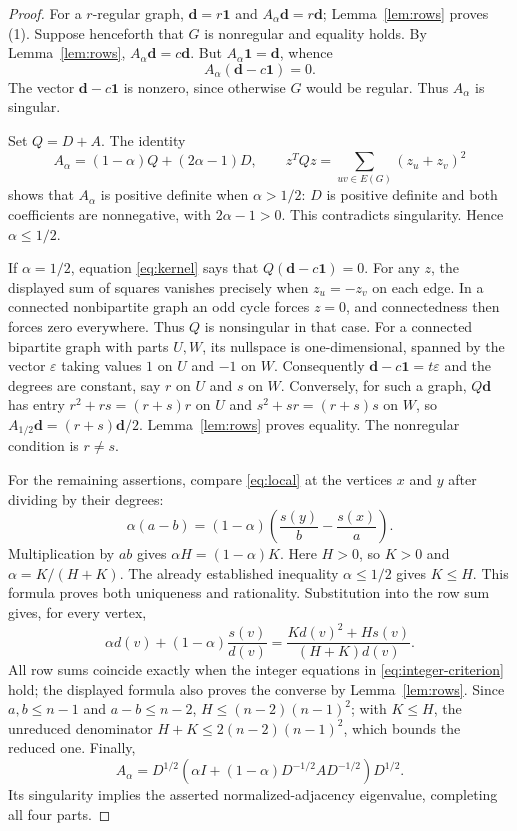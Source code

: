 \documentclass[11pt]{amsart}
\theoremstyle{remark}
\newcommand{\dd}{\boldsymbol{d}}
\newcommand{\one}{\boldsymbol{1}}
\begin{document}
\begin{proof}
For a $r$-regular graph, $\dd=r\one$ and
$A_\alpha\dd=r\dd$; Lemma~\ref{lem:rows} proves (1).
Suppose henceforth that $G$ is nonregular and equality holds.
By Lemma~\ref{lem:rows}, $A_\alpha\dd=c\dd$. But
$A_\alpha\one=\dd$, whence
\begin{equation}\label{eq:kernel}
 A_\alpha(\dd-c\one)=0.
\end{equation}
The vector $\dd-c\one$ is nonzero, since otherwise $G$ would be
regular. Thus $A_\alpha$ is singular.

Set $Q=D+A$. The identity
\[
 A_\alpha=(1-\alpha)Q+(2\alpha-1)D,
 \qquad z^TQz=\sum_{uv\in E(G)}(z_u+z_v)^2
\]
shows that $A_\alpha$ is positive definite when $\alpha>1/2$:
$D$ is positive definite and both coefficients are nonnegative,
with $2\alpha-1>0$. This contradicts singularity. Hence
$\alpha\leq1/2$.

If $\alpha=1/2$, equation \eqref{eq:kernel} says that
$Q(\dd-c\one)=0$. For any $z$, the displayed sum of squares
vanishes precisely when $z_u=-z_v$ on each edge. In a connected
nonbipartite graph an odd cycle forces $z=0$, and connectedness then
forces zero everywhere. Thus $Q$ is nonsingular in that case.
For a connected bipartite graph with parts $U,W$, its nullspace is
one-dimensional, spanned by the vector $\varepsilon$ taking values
$1$ on $U$ and $-1$ on $W$. Consequently
$\dd-c\one=t\varepsilon$ and the degrees are constant, say $r$
on $U$ and $s$ on $W$. Conversely, for such a graph,
$Q\dd$ has entry $r^2+rs=(r+s)r$ on $U$ and
$s^2+sr=(r+s)s$ on $W$, so
$A_{1/2}\dd=(r+s)\dd/2$. Lemma~\ref{lem:rows}
proves equality. The nonregular condition is $r\ne s$.

For the remaining assertions, compare \eqref{eq:local} at the
vertices $x$ and $y$ after dividing by their degrees:
\[
 \alpha(a-b)=(1-\alpha)
       \left(\frac{s(y)}b-\frac{s(x)}a\right).
\]
Multiplication by $ab$ gives $\alpha H=(1-\alpha)K$.
Here $H>0$, so $K>0$ and $\alpha=K/(H+K)$.
The already established inequality $\alpha\leq1/2$
gives $K\leq H$. This formula proves both uniqueness and rationality.
Substitution into the row sum gives, for every vertex,
\[
 \alpha d(v)+(1-\alpha)\frac{s(v)}{d(v)}
   =\frac{Kd(v)^2+Hs(v)}{(H+K)d(v)}.
\]
All row sums coincide exactly when the integer equations in
\eqref{eq:integer-criterion} hold; the displayed formula also
proves the converse by Lemma~\ref{lem:rows}. Since
$a,b\leq n-1$ and $a-b\leq n-2$,
$H\leq(n-2)(n-1)^2$; with $K\leq H$, the unreduced denominator
$H+K\leq2(n-2)(n-1)^2$, which bounds the reduced one.
Finally,
\[
 A_\alpha=D^{1/2}
 \left(\alpha I+(1-\alpha)D^{-1/2}AD^{-1/2}\right)D^{1/2}.
\]
Its singularity implies the asserted normalized-adjacency eigenvalue,
completing all four parts.
\end{proof}
\end{document}

